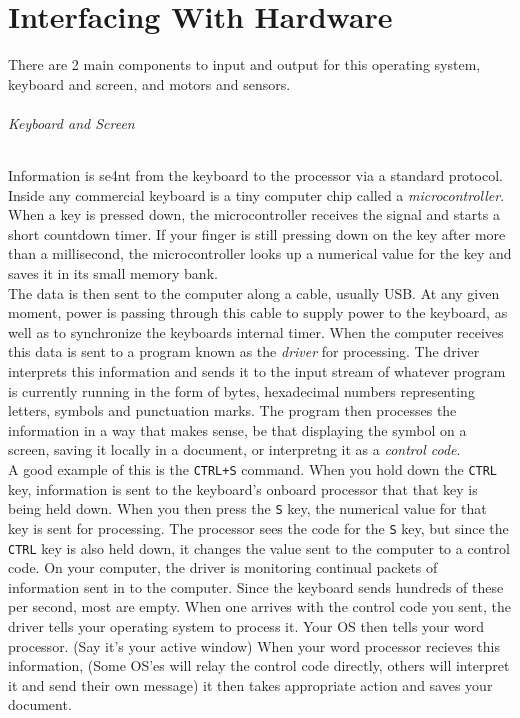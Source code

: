 \documentclass[english]{article}
\begin{document}
\part{Interfacing With Hardware}
There are 2 main components to input and output for this operating system, keyboard and screen, and motors and sensors.
\paragraph{Keyboard and Screen}
Information is se4nt from the keyboard to the processor via a standard protocol. Inside any commercial keyboard is a tiny computer chip
called a {\it microcontroller}. When a key is pressed down, the microcontroller receives the signal and starts a short countdown timer. If your finger is still pressing down on the key after more than a millisecond, the microcontroller looks up a numerical value for the key
and saves it in its small memory bank.
\break
\\The data is then sent to the computer along a cable, usually USB. At any given moment, power
is passing through this cable to supply power to the keyboard, as well as to synchronize the keyboards internal timer. When the
computer receives this data is sent to a program known as the {\it driver} for processing. The driver interprets this information
and sends it to the input stream of whatever program is currently running in the form of bytes, hexadecimal numbers representing
letters, symbols and punctuation marks. The program then processes the information in a way that makes sense, be that displaying
the symbol on a screen, saving it locally in a document, or interpretng it as a {\it control code}.
\break
\\A good example of this is the \texttt{CTRL+S} command. When you hold down the \texttt{CTRL} key, information is sent to the keyboard's onboard processor that that key is being held down. When you then press the \texttt{S} key, the numerical value for that key is sent for processing. The processor sees the code for the \texttt{S} key, but since the \texttt{CTRL} key is also held down, it changes the value sent to the computer to a control code. On your computer, the driver is monitoring continual packets of information sent in to the computer. Since the keyboard sends hundreds of these per second, most are empty. When one arrives with the control code you sent, the driver tells your operating system to process it. Your OS then tells your word processor. (Say it's your active window) When your word processor recieves this information, (Some OS'es will relay the control code directly, others will interpret it and send their own message) it then takes appropriate action and saves your document.
\end{document}
